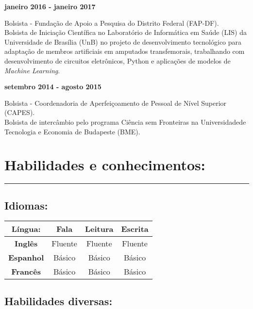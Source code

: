 \documentclass[11pt]{article}
\begin{document}
\textbf{janeiro 2016 - janeiro 2017}
\begin{addmargin}{0.5cm}
Bolsista - Fundação de Apoio a Pesquisa do Distrito Federal (FAP-DF).\\
Bolsista de Iniciação Científica no Laboratório de Informática em Saúde (LIS)  da Universidade de
Brasília (UnB) no projeto
de desenvolvimento tecnológico para adaptação de membros artificiais em amputados transfemorais,
trabalhando com desenvolvimento de circuitos eletrônicos, Python e aplicações de modelos de 
\textit{Machine Learning}.\\

\end{addmargin}

    \textbf{setembro 2014 - agosto 2015}
    \begin{addmargin}{0.5cm}
        Bolsista - Coordenadoria de Aperfeiçoamento de Pessoal de Nível Superior (CAPES). \\
        Bolsista de intercâmbio pelo programa Ciência sem Fronteiras na Universidadede Tecnologia e Economia de Budapeste (BME). 
\end{addmargin}

\section{Habilidades e conhecimentos:}
\hrule \vspace{0.1cm}

\subsection{Idiomas:}
\begin{center}
\begin{tabular}{c | c | c | c}
\hline
\textbf{Língua:} & Fala & Leitura & Escrita \\
\hline
\hline
\textbf{Inglês} &  Fluente & Fluente & Fluente  \\
\hline
\textbf{Espanhol} & Básico & Básico & Básico \\
\hline
\textbf{Francês} & Básico & Básico & Básico \\
\hline
\end{tabular}
\end{center}

\subsection{Habilidades diversas:}
\end{document}

